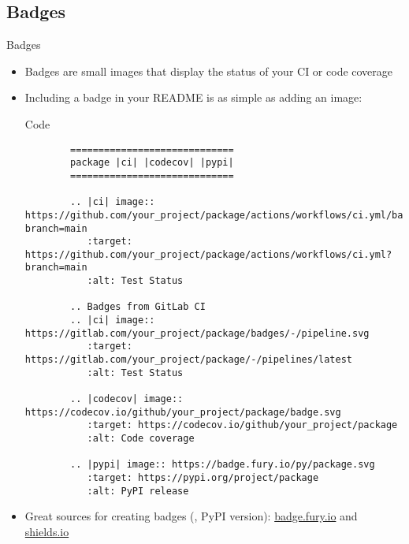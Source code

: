 \subsection{Badges}
\begin{frame}[fragile]{Badges}
  \begin{itemize}
    \item Badges are small images that display the status of your CI or code coverage
    \item Including a badge in your README is as simple as adding an image:
      \begin{block}{Code}
        \scriptsize
        \begin{verbatim}
        =============================
        package |ci| |codecov| |pypi|
        =============================

        .. |ci| image:: https://github.com/your_project/package/actions/workflows/ci.yml/badge.svg?branch=main
           :target: https://github.com/your_project/package/actions/workflows/ci.yml?branch=main
           :alt: Test Status

        .. Badges from GitLab CI
        .. |ci| image:: https://gitlab.com/your_project/package/badges/-/pipeline.svg
           :target: https://gitlab.com/your_project/package/-/pipelines/latest
           :alt: Test Status

        .. |codecov| image:: https://codecov.io/github/your_project/package/badge.svg
           :target: https://codecov.io/github/your_project/package
           :alt: Code coverage

        .. |pypi| image:: https://badge.fury.io/py/package.svg
           :target: https://pypi.org/project/package
           :alt: PyPI release
        \end{verbatim}
      \end{block}
    \item Great sources for creating badges (\eg, PyPI version): \href{https://badge.fury.io/}{badge.fury.io}
      and \href{https://shields.io}{shields.io}
  \end{itemize}
\end{frame}

